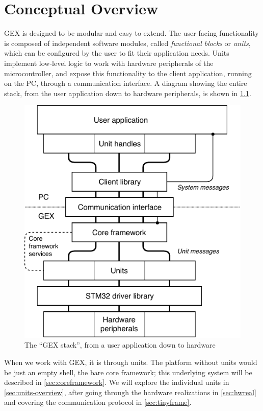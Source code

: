 \chapter{Conceptual Overview} \label{sec:conceptual}

GEX is designed to be modular and easy to extend. The user-facing functionality is composed of independent software modules, called \textit{functional blocks} or \textit{units}, which can be configured by the user to fit their application needs. Units implement low-level logic to work with hardware peripherals of the microcontroller, and expose this functionality to the client application, running on the \gls{PC}, through a communication interface. A diagram showing the entire stack, from the user application down to hardware peripherals, is shown in \cref{fig:conceptual}.

\begin{figure}[h]
	\centering
	\includegraphics[scale=1]{img/conceptual.pdf}
	\caption[GEX conceptual overview]{\label{fig:conceptual}The ``GEX stack'', from a user application down to hardware}
\end{figure}

When we work with GEX, it is through units. The platform without units would be just an empty shell, the bare core framework; this underlying system will be described in \cref{sec:coreframework}. We will explore the individual units in \cref{sec:units-overview}, after going through the hardware realizations in \cref{sec:hwreal} and covering the communication protocol in \cref{sec:tinyframe}. 

